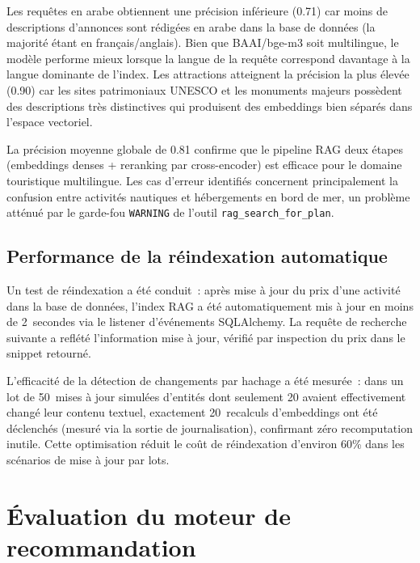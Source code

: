 Les requêtes en arabe obtiennent une précision inférieure (0.71) car moins de descriptions
d'annonces sont rédigées en arabe dans la base de données (la majorité étant en
français/anglais). Bien que BAAI/bge-m3 soit multilingue, le modèle performe mieux lorsque
la langue de la requête correspond davantage à la langue dominante de l'index. Les
attractions atteignent la précision la plus élevée (0.90) car les sites patrimoniaux
UNESCO et les monuments majeurs possèdent des descriptions très distinctives qui produisent
des embeddings bien séparés dans l'espace vectoriel.

La précision moyenne globale de 0.81 confirme que le pipeline RAG deux étapes
(embeddings denses + reranking par cross-encoder) est efficace pour le domaine touristique
multilingue. Les cas d'erreur identifiés concernent principalement la confusion entre
activités nautiques et hébergements en bord de mer, un problème atténué par le garde-fou
\texttt{WARNING} de l'outil \texttt{rag\_search\_for\_plan}.


\subsection{Performance de la réindexation automatique}

Un test de réindexation a été conduit~: après mise à jour du prix d'une activité dans la base
de données, l'index RAG a été automatiquement mis à jour en moins de 2~secondes via le
listener d'événements SQLAlchemy. La requête de recherche suivante a reflété l'information
mise à jour, vérifié par inspection du prix dans le snippet retourné.

L'efficacité de la détection de changements par hachage a été mesurée~: dans un lot de
50~mises à jour simulées d'entités dont seulement 20 avaient effectivement changé leur
contenu textuel, exactement 20~recalculs d'embeddings ont été déclenchés (mesuré via la
sortie de journalisation), confirmant zéro recomputation inutile. Cette optimisation réduit
le coût de réindexation d'environ 60\% dans les scénarios de mise à jour par lots.

\section{Évaluation du moteur de recommandation}

